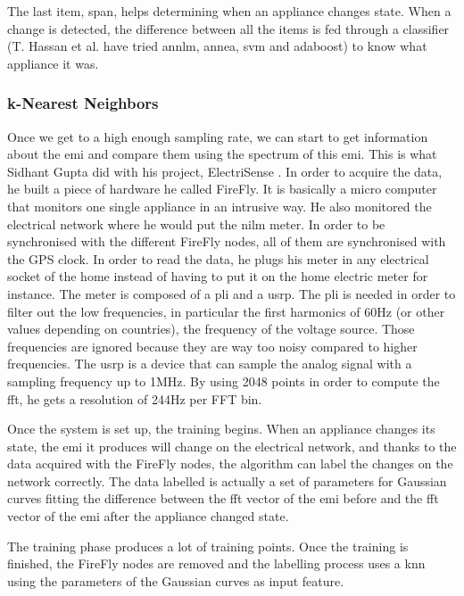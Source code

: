 The last item, span, helps determining when an appliance changes state. When a change is detected, the difference between all the items is fed through a classifier (T. Hassan et al. have tried \acrshort{annlm}, \acrshort{annea}, \acrshort{svm} and \acrshort{adaboost}\cite{hassan2014empirical}) to know what appliance it was. 

\subsubsection{k-Nearest Neighbors}\label{section:high-freq}
Once we get to a high enough sampling rate, we can start to get information about the \acrfull{emi} and compare them using the spectrum of this \acrshort{emi}. This is what Sidhant Gupta did with his project, ElectriSense \cite{gupta2010electrisense}. In order to acquire the data, he built a piece of hardware he called FireFly. It is basically a micro computer that monitors one single appliance in an intrusive way. He also monitored the electrical network where he would put the \acrshort{nilm} meter. In order to be synchronised with the different FireFly nodes, all of them are synchronised with the GPS clock.
In order to read the data, he plugs his meter in any electrical socket of the home instead of having to put it on the home electric meter for instance. The meter is composed of a \acrfull{pli} and a \acrfull{usrp}. The \acrshort{pli} is needed in order to filter out the low frequencies, in particular the first harmonics of 60Hz (or other values depending on countries), the frequency of the voltage source. Those frequencies are ignored because they are way too noisy compared to higher frequencies. The \acrshort{usrp} is a device that can sample the analog signal with a sampling frequency up to 1MHz. By using 2048 points in order to compute the \acrshort{fft}, he gets a resolution of 244Hz per FFT bin.

Once the system is set up, the training begins. When an appliance changes its state, the \acrshort{emi} it produces will change on the electrical network, and thanks to the data acquired with the FireFly nodes, the algorithm can label the changes on the network correctly. The data labelled is actually a set of parameters for Gaussian curves fitting the difference between the \acrshort{fft} vector of the \acrshort{emi} before and the \acrshort{fft} vector of the \acrshort{emi} after the appliance changed state.

The training phase produces a lot of training points. Once the training is finished, the FireFly nodes are removed and the labelling process uses a \acrshort{knn} using the parameters of the Gaussian curves as input feature.

